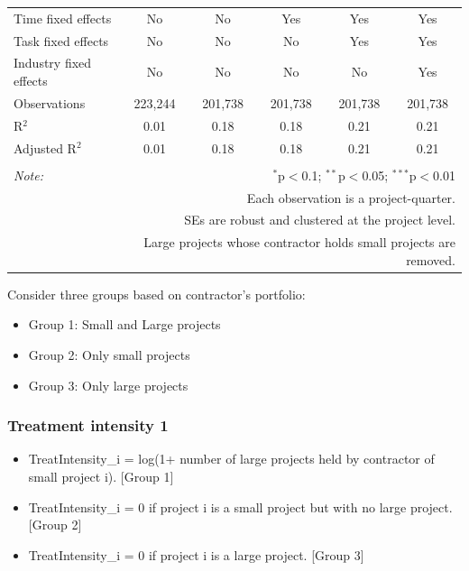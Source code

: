 \documentclass[
]{article}
\providecommand{\tightlist}{%
  \setlength{\itemsep}{0pt}\setlength{\parskip}{0pt}}
\begin{document}
\begin{table}[H]
\begin{tabular}{@{\extracolsep{-2pt}}lccccc}
Time fixed effects & No & No & Yes & Yes & Yes \\ 
Task fixed effects & No & No & No & Yes & Yes \\ 
Industry fixed effects & No & No & No & No & Yes \\ 
Observations & 223,244 & 201,738 & 201,738 & 201,738 & 201,738 \\ 
R$^{2}$ & 0.01 & 0.18 & 0.18 & 0.21 & 0.21 \\ 
Adjusted R$^{2}$ & 0.01 & 0.18 & 0.18 & 0.21 & 0.21 \\ 
\hline 
\hline \\[-1.8ex] 
\textit{Note:}  & \multicolumn{5}{r}{$^{*}$p$<$0.1; $^{**}$p$<$0.05; $^{***}$p$<$0.01} \\ 
 & \multicolumn{5}{r}{Each observation is a project-quarter.} \\ 
 & \multicolumn{5}{r}{SEs are robust and clustered at the project level.} \\ 
 & \multicolumn{5}{r}{Large projects whose contractor holds small projects are removed.} \\ 
\end{tabular} 
\end{table}

Consider three groups based on contractor's portfolio:

\begin{itemize}
\tightlist
\item
  Group 1: Small and Large projects
\item
  Group 2: Only small projects
\item
  Group 3: Only large projects
\end{itemize}

\hypertarget{treatment-intensity-1}{%
\subsubsection{Treatment intensity 1}\label{treatment-intensity-1}}

\begin{itemize}
\tightlist
\item
  TreatIntensity\_i = log(1+ number of large projects held by contractor
  of small project i). {[}Group 1{]}
\item
  TreatIntensity\_i = 0 if project i is a small project but with no
  large project. {[}Group 2{]}
\item
  TreatIntensity\_i = 0 if project i is a large project. {[}Group 3{]}
\end{itemize}
\end{document}
